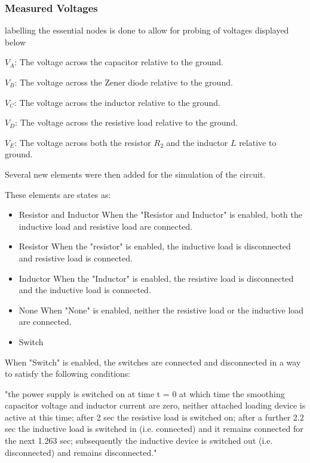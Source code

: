 \subsubsection{Measured Voltages}

labelling the essential nodes is done to allow for probing of voltages displayed below

$V_A$: The voltage across the capacitor relative to the ground.

$V_B$: The voltage across the Zener diode relative to the ground.

$V_C$: The voltage across the inductor relative to the ground.

$V_D$: The voltage across the resistive load relative to the ground.

$V_E$: The voltage across both the resistor $R_2$ and the inductor $L$ relative to ground.

Several new elements were then added for the simulation of the circuit. 

These elements are states as: 
\begin{itemize}
    \item Resistor and Inductor
When the "Resistor and Inductor" is enabled, both the inductive load and resistive load are connected.

    \item Resistor
When the "resistor" is enabled, the inductive load is disconnected and resistive load is connected. 

    \item Inductor
When the "Inductor" is enabled, the resistive load is disconnected and the inductive load is connected. 

    \item None 
When "None" is enabled, neither the resistive load or the inductive load are connected.

    \item Switch
\end{itemize}
  When "Switch" is enabled, the switches are connected and disconnected in a way to satisfy the following conditions:

"the power supply is switched on at time t = 0 at which time the smoothing capacitor voltage and inductor current are zero, neither attached loading device is active at this time; after 2 sec the resistive load is switched on; after a further 2.2 sec the inductive load is switched in (i.e. connected) and it remains connected for the next 1.263 sec; subsequently the inductive device is switched out (i.e. disconnected) and remains disconnected."

